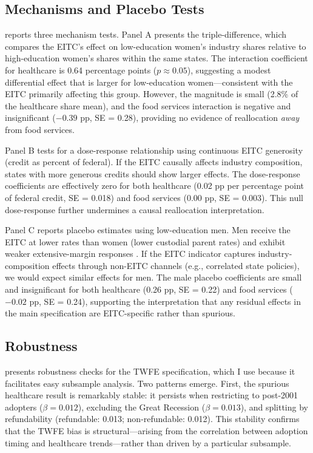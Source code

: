\documentclass[12pt]{article}
\begin{document}
\subsection{Mechanisms and Placebo Tests}



 reports three mechanism tests. Panel A presents the triple-difference, which compares the EITC's effect on low-education women's industry shares relative to high-education women's shares within the same states. The interaction coefficient for healthcare is 0.64 percentage points ($p \approx 0.05$), suggesting a modest differential effect that is larger for low-education women---consistent with the EITC primarily affecting this group. However, the magnitude is small (2.8\% of the healthcare share mean), and the food services interaction is negative and insignificant ($-0.39$ pp, SE = 0.28), providing no evidence of reallocation \textit{away} from food services.

Panel B tests for a dose-response relationship using continuous EITC generosity (credit as percent of federal). If the EITC causally affects industry composition, states with more generous credits should show larger effects. The dose-response coefficients are effectively zero for both healthcare (0.02 pp per percentage point of federal credit, SE = 0.018) and food services (0.00 pp, SE = 0.003). This null dose-response further undermines a causal reallocation interpretation.

Panel C reports placebo estimates using low-education men. Men receive the EITC at lower rates than women (lower custodial parent rates) and exhibit weaker extensive-margin responses \citep{eissa2006, nichols2016}. If the EITC indicator captures industry-composition effects through non-EITC channels (e.g., correlated state policies), we would expect similar effects for men. The male placebo coefficients are small and insignificant for both healthcare (0.26 pp, SE = 0.22) and food services ($-0.02$ pp, SE = 0.24), supporting the interpretation that any residual effects in the main specification are EITC-specific rather than spurious.

\subsection{Robustness}



 presents robustness checks for the TWFE specification, which I use because it facilitates easy subsample analysis. Two patterns emerge. First, the spurious healthcare result is remarkably stable: it persists when restricting to post-2001 adopters ($\beta = 0.012$), excluding the Great Recession ($\beta = 0.013$), and splitting by refundability (refundable: 0.013; non-refundable: 0.012). This stability confirms that the TWFE bias is structural---arising from the correlation between adoption timing and healthcare trends---rather than driven by a particular subsample.
\end{document}

